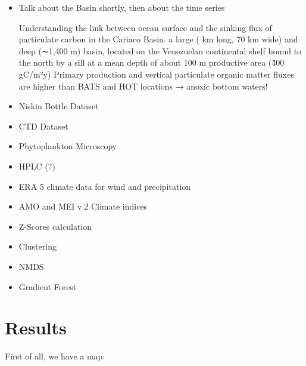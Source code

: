 \documentclass[a4paper]{article}
\begin{document}
        \begin{itemize}

            
            \item Talk about the Basin shortly, then about the time series

            Understanding the link between ocean surface and the sinking flux of particulate carbon in the Cariaco Basin.
                a large ( km long, 70 km wide) and deep (∼1,400 m) basin, located on the Venezuelan continental shelf
                bound to the north by a sill at a mean depth of about 100 m
                productive area (\~400 gC/m²y)
                Primary production and vertical particulate organic matter fluxes are higher than BATS and HOT locations → anoxic bottom waters!

            \item Niskin Bottle Dataset

            \item CTD Dataset

            \item Phytoplankton Microscopy

            \item HPLC (?)

            \item ERA 5 climate data for wind and precipitation
            
            \item AMO and MEI v.2 Climate indices

            \item Z-Scores calculation
            
            \item Clustering
    
            \item NMDS
            
            \item Gradient Forest
            
        \end{itemize}

    \section{Results}
    \label{sec:results}
    
    
            First of all, we have a map:
            
\end{document}
